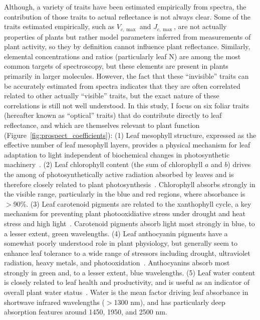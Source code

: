 Although, a variety of traits have been estimated empirically from spectra, the contribution of those traits to actual reflectance is not always clear.
Some of the traits estimated empirically, such as $V_{c,\max}$ and $J_{c,\max}$, are not actually properties of plants but rather model parameters inferred from measurements of plant activity, so they by definition cannot influence plant reflectance.
Similarly, elemental concentrations and ratios (particularly leaf N) are among the most common targets of spectroscopy, but these elements are present in plants primarily in larger molecules.
However, the fact that these ``invisible'' traits can be accurately estimated from spectra indicates that they are often correlated related to other actually ``visible'' traits, but the exact nature of these correlations is still not well understood.
In this study, I focus on six foliar traits (hereafter known as ``optical'' traits) that do contribute directly to leaf reflectance, and which are themselves relevant to plant function (Figure~\ref{fig:prospect_coefficients}):
(1) Leaf mesophyll structure, expressed as the effective number of leaf mesophyll layers, provides a physical mechanism for leaf adaptation to light independent of biochemical changes in photosynthetic machinery~\cite{ivanov_2016_photosynthesis,schollert_2017_leaf}.
(2) Leaf chlorophyll content (the sum of chlorophyll $a$ and $b$) drives the among of photosynthetically active radiation absorbed by leaves and is therefore closely related to plant photosynthesis~\cite{croft_2017_chlorophyll}.
Chlorophyll absorbs strongly in the visible range, particularly in the blue and red regions, where absorbance is $>$90\%.
(3) Leaf carotenoid pigments are related to the xanthophyll cycle, a key mechanism for preventing plant photooxidiative stress under drought and heat stress and high light~\cite{ruban_2007_identifcation}.
Carotenoid pigments absorb light most strongly in blue, to a lesser extent, green wavelengths.
(4) Leaf anthocyanin pigments have a somewhat poorly understood role in plant physiology, but generally seem to enhance leaf tolerance to a wide range of stressors including drought, ultraviolet radiation, heavy metals, and photooxidation~\cite{gould_2004_nature}.
Anthocyanins absorb most strongly in green and, to a lesser extent, blue wavelengths.
(5) Leaf water content is closely related to leaf health and productivity, and is useful as an indicator of overall plant water status~\cite{penuelas_1994_reflectance,kramer_1995_water,cheng_2011_spectroscopic,chavana_bryant_2016_leaf}.
Water is the mean factor driving leaf absorbance in shortwave infrared wavelengths ($>$1300 nm), and has particularly deep absorption features around 1450, 1950, and 2500 nm.
